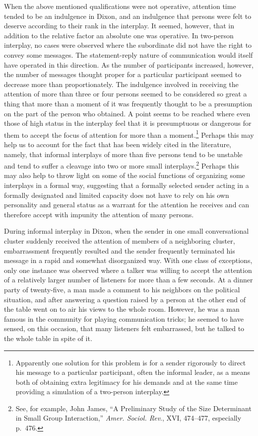 \documentclass[openany,nobib]{tufte-book}
\begin{document}
When the above mentioned qualifications were not operative, attention
time tended to be an indulgence in Dixon, and an indulgence that persons
were felt to deserve according to their rank in the interplay. It
seemed, however, that in addition to the relative factor an absolute one
was operative. In two-person interplay, no cases were observed where the
subordinate did not have the right to convey some messages. The
statement-reply nature of communication would itself have operated in
this direction. As the number of participants increased, however, the
number of messages thought proper for a particular participant seemed to
decrease more than proportionately. The indulgence involved in receiving
the attention of more than three or four persons seemed to be considered
so great a thing that more than a moment of it was frequently thought to
be a presumption on the part of the person who obtained. A point seems
to be reached where even those of high status in the interplay feel that
it is presumptuous or dangerous for them to accept the focus of
attention for more than a moment.\footnote{Apparently one solution for
  this problem is for a sender rigorously to direct his message to a
  particular participant, often the informal leader, as a means both of
  obtaining extra legitimacy for his demands and at the same time
  providing a simulation of a two-person interplay.} Perhaps this may
help us to account for the fact that has been widely cited in the
literature, namely, that informal interplays of more than five persons
tend to be unstable and tend to suffer a cleavage into two or more small
interplays.\footnote{See, for example, John James, ``A Preliminary Study
  of the Size Determinant in Small Group Interaction,'' \emph{Amer.
  Sociol. Rev}., XVI, 474--477, especially p.~476.} Perhaps this may
also help to throw light on some of the social functions of organizing
some interplays in a formal way, suggesting that a formally selected
sender acting in a formally designated and limited capacity does not
have to rely on his own personality and general status as a warrant for
the attention he receives and can therefore accept with impunity the
attention of many persons.

During informal interplay in Dixon, when the sender in one small
conversational cluster suddenly received the attention of members of a
neighboring cluster, embarrassment frequently resulted and the sender
frequently terminated his message in a rapid and somewhat disorganized
way. With one class of exceptions, only one instance was observed where
a talker was willing to accept the attention of a relatively larger
number of listeners for more than a few seconds. At a dinner party of
twenty-five, a man made a comment to his neighbors on the political
situation, and after answering a question raised by a person at the
other end of the table went on to air his views to the whole room.
However, he was a man famous in the community for playing communication
tricks; he seemed to have sensed, on this occasion, that many listeners
felt embarrassed, but he talked to the whole table in spite of it.
\end{document}
